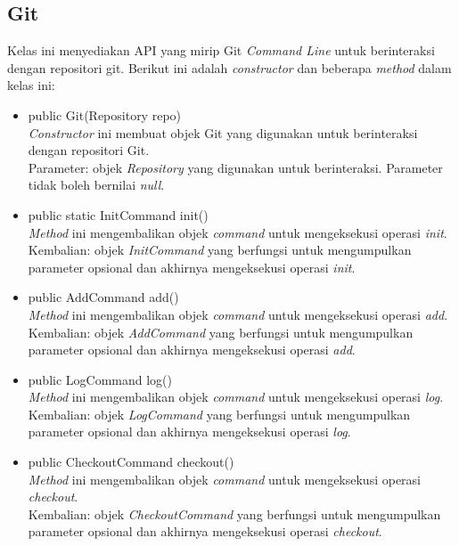 \subsection{Git}
\label{subsec:Git}
Kelas ini menyediakan API yang mirip Git \textit{Command Line} untuk berinteraksi dengan repositori git. Berikut ini adalah \textit{constructor} dan beberapa \textit{method} dalam kelas ini:
\begin{itemize}
\item public Git(Repository repo)\\
\textit{Constructor} ini membuat objek Git yang digunakan untuk berinteraksi dengan repositori Git.\\
Parameter: objek \textit{Repository} yang digunakan untuk berinteraksi. Parameter tidak boleh bernilai \textit{null}. 

\item public static InitCommand init()\\
\textit{Method} ini mengembalikan objek \textit{command} untuk mengeksekusi operasi \textit{init}.\\
Kembalian: objek \textit{InitCommand} yang berfungsi untuk mengumpulkan parameter opsional dan akhirnya mengeksekusi operasi \textit{init}.

\item public AddCommand add()\\
\textit{Method} ini mengembalikan objek \textit{command} untuk mengeksekusi operasi \textit{add}.\\
Kembalian: objek \textit{AddCommand} yang berfungsi untuk mengumpulkan parameter opsional dan akhirnya mengeksekusi operasi \textit{add}.

\item public LogCommand log()\\
\textit{Method} ini mengembalikan objek \textit{command} untuk mengeksekusi operasi \textit{log}.\\
Kembalian: objek \textit{LogCommand} yang berfungsi untuk mengumpulkan parameter opsional dan akhirnya mengeksekusi operasi \textit{log}.

\item public CheckoutCommand checkout()\\
\textit{Method} ini mengembalikan objek \textit{command} untuk mengeksekusi operasi \textit{checkout}.\\
Kembalian: objek \textit{CheckoutCommand} yang berfungsi untuk mengumpulkan parameter opsional dan akhirnya mengeksekusi operasi \textit{checkout}.


\end{itemize}
